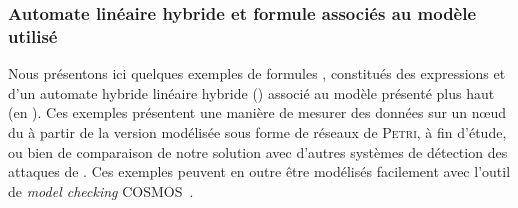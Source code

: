         \subsubsection{Automate linéaire hybride et formule \lsah associés au modèle utilisé}
Nous présentons ici quelques exemples de formules \lsah, constitués des expressions \lsah et d'un automate hybride linéaire hybride (\alh) associé au modèle \rpsge présenté plus haut (en ).
Ces exemples présentent une manière de mesurer des données sur un nœud du \rc à partir de la version modélisée sous forme de réseaux de \textsc{Petri}, à fin d'étude, ou bien de comparaison de notre solution avec d'autres systèmes de détection des attaques de \dds.
Ces exemples peuvent en outre être modélisés facilement avec l'outil de \textit{model checking} \textsf{COSMOS}~\cite{BDDHP11cosmos}.

